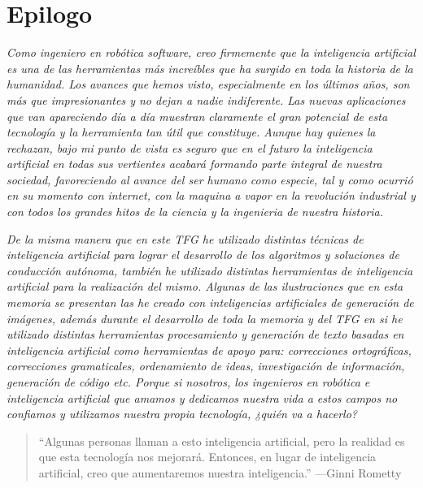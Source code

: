 \chapter*{Epilogo}
\label{cap:Epilogo}

\textit{Como ingeniero en robótica software, creo firmemente que la inteligencia artificial es una de las herramientas más increíbles que ha surgido en toda la historia de la humanidad. Los avances que hemos visto, especialmente en los últimos años, son más que impresionantes y no dejan a nadie indiferente. Las nuevas aplicaciones que van apareciendo día a día muestran claramente el gran potencial de esta tecnología y la herramienta tan útil que constituye. Aunque hay quienes la rechazan, bajo mi punto de vista es seguro que en el futuro la inteligencia artificial en todas sus vertientes acabará formando parte integral de nuestra sociedad, favoreciendo al avance del ser humano como especie, tal y como ocurrió en su momento con internet, con la maquina a vapor en la revolución industrial y con todos los grandes hitos de la ciencia y la ingenieria de nuestra historia.}

\bigskip

\textit{De la misma manera que en este TFG he utilizado distintas técnicas de inteligencia artificial para lograr el desarrollo de los algoritmos y soluciones de conducción autónoma, también he utilizado distintas herramientas de inteligencia artificial para la realización del mismo. Algunas de las ilustraciones que en esta memoria se presentan las he creado con inteligencias artificiales de generación de imágenes, además durante el desarrollo de toda la memoria y del TFG en si he utilizado distintas herramientas procesamiento y generación de texto basadas en inteligencia artificial como herramientas de apoyo para: correcciones ortográficas, correcciones gramaticales, ordenamiento de ideas, investigación de información, generación de código etc. Porque si nosotros, los ingenieros en robótica e inteligencia artificial que amamos y dedicamos nuestra vida a estos campos no confiamos y utilizamos nuestra propia tecnología, ¿quién va a hacerlo?}

\bigskip

\begin{quote}
    ``Algunas personas llaman a esto inteligencia artificial, pero la realidad es que esta tecnología nos mejorará. Entonces, en lugar de inteligencia artificial, creo que aumentaremos nuestra inteligencia.''
    \hfill ---Ginni Rometty
\end{quote}

\bigskip
